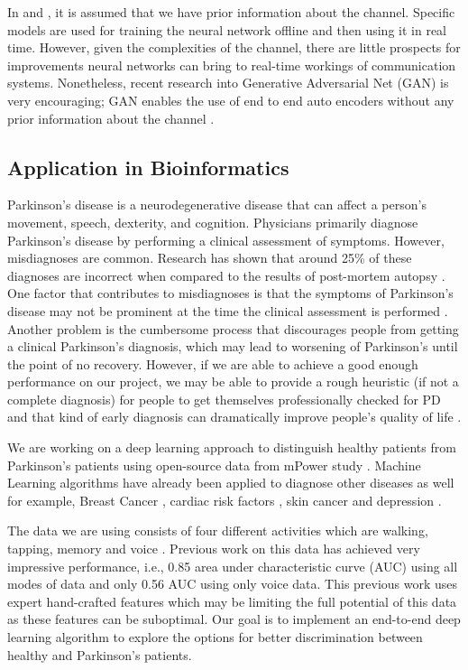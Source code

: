 In \cite{ye2018power} and \cite{felix2018ofdm}, it is assumed that we have prior information about the channel. Specific models are used for training the neural network offline and then using it in real time. However, given the complexities of the channel, there are little prospects for improvements neural networks can bring to real-time workings of communication systems. Nonetheless, recent research into Generative Adversarial Net (GAN) is very encouraging; GAN enables the use of end to end auto encoders without any prior information about the channel \cite{ye2018channel}. 
\subsection{Application in Bioinformatics}
Parkinson’s disease is a neurodegenerative disease that can affect a person’s movement, speech, dexterity, and cognition. Physicians primarily diagnose Parkinson’s disease by performing a clinical assessment of symptoms. However, misdiagnoses are common. Research has shown that around 25\% of these diagnoses are incorrect when compared to the results of post-mortem autopsy \cite{pahwa2010early}. One factor that contributes to misdiagnoses is that the symptoms of Parkinson’s disease may not be prominent at the time the clinical assessment is performed \cite{schwab2018phonemd}. Another problem is the cumbersome process that discourages people from getting a clinical Parkinson's diagnosis, which may lead to worsening of Parkinson's until the point of no recovery. However, if we are able to achieve a good enough performance on our project, we may be able to provide a rough heuristic (if not a complete diagnosis) for people to get themselves professionally checked for PD and that kind of early diagnosis can dramatically improve people's quality of life \cite{pahwa2010early}. 

We are working on a deep learning approach to distinguish healthy patients from Parkinson’s patients using open-source data from mPower study \cite{bot2016mpower}. Machine Learning algorithms have already been applied to diagnose other diseases as well for example, Breast Cancer \cite{zheng2014breast}, cardiac risk factors \cite{oresko2010wearable}, skin cancer \cite{esteva2017dermatologist} and depression \cite{suhara2017deepmood}.

The data we are using consists of four different activities which are walking, tapping, memory and voice \cite{bot2016mpower}. Previous work on this data has achieved very impressive performance, i.e., 0.85 area under characteristic curve (AUC) \cite{schwab2018phonemd} using all modes of data and only 0.56 AUC using only voice data. This previous work uses expert hand-crafted features \cite{arora2015detecting} which may be limiting the full potential of this data as these features can be suboptimal. Our goal is to implement an end-to-end deep learning algorithm to explore the options for better discrimination between healthy and Parkinson’s patients.
